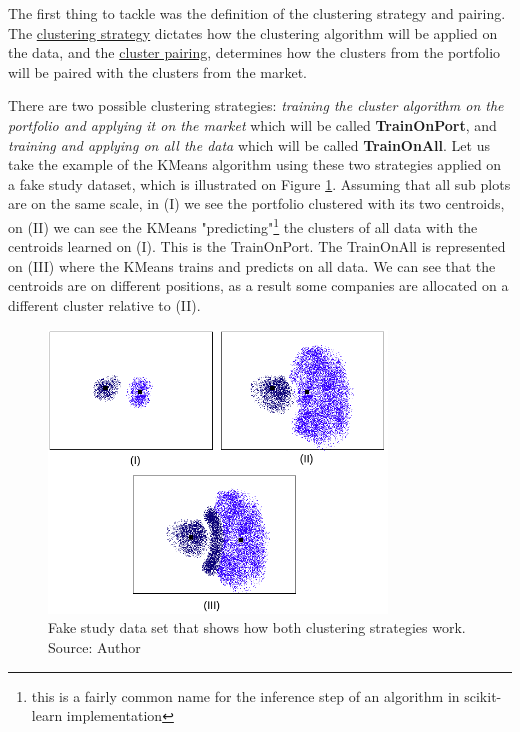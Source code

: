 \newcommand{\nameClusterStrategyA}{TrainOnPort}
\newcommand{\nameClusterStrategyB}{TrainOnAll}
\newcommand{\nameClusterPairingA}{PairWithItsCluster}
\newcommand{\nameClusterPairingB}{PairWithAllMarket}


The first thing to tackle was the definition of the clustering strategy and pairing. The \underline{clustering strategy} dictates how the clustering algorithm will be applied on the data, and the \underline{cluster pairing}, determines how the clusters from the portfolio will be paired with the clusters from the market.

There are two possible clustering strategies: \textit{training the cluster algorithm on the portfolio and applying it on the market} which will be called \textbf{\nameClusterStrategyA{}}, and \textit{training and applying on all the data} which will be called \textbf{\nameClusterStrategyB{}}. Let us take the example of the KMeans algorithm using these two strategies applied on a fake study dataset, which is illustrated on Figure \ref{fig:cluster-strategy}. Assuming that all sub plots are on the same scale, in (I) we see the portfolio clustered with its two centroids, on (II) we can see the KMeans "predicting"\footnote{this is a fairly common name for the inference step of an algorithm in scikit-learn implementation} the clusters of all data with the centroids learned on (I). This is the \nameClusterStrategyA{}. The \nameClusterStrategyB{} is represented on (III) where the KMeans trains and predicts on all data. We can see that the centroids are on different positions, as a result some companies are allocated on a different cluster relative to (II). 

\begin{figure}[h]
   \centering
   \includegraphics[width=9cm]{fig/ch3-cluster-strategy.png}
   \caption{Fake study data set that shows how both clustering strategies work. Source: Author}
   \label{fig:cluster-strategy}
\end{figure}

